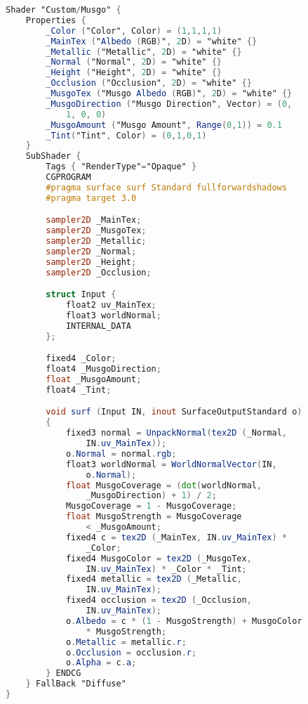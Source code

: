 \label{an:codigo-fonte-musgo-unity}



\begin{lstlisting}[language=GLSL, caption={\label{cf:musgo} Shader de efeito de musgo na Unity}]
Shader "Custom/Musgo" {
	Properties {
		_Color ("Color", Color) = (1,1,1,1)
		_MainTex ("Albedo (RGB)", 2D) = "white" {}
		_Metallic ("Metallic", 2D) = "white" {}
		_Normal ("Normal", 2D) = "white" {}
		_Height ("Height", 2D) = "white" {}
		_Occlusion ("Occlusion", 2D) = "white" {}
		_MusgoTex ("Musgo Albedo (RGB)", 2D) = "white" {}
		_MusgoDirection ("Musgo Direction", Vector) = (0, 
			1, 0, 0)
		_MusgoAmount ("Musgo Amount", Range(0,1)) = 0.1
		_Tint("Tint", Color) = (0,1,0,1)
	}
	SubShader {
		Tags { "RenderType"="Opaque" }
		CGPROGRAM
		#pragma surface surf Standard fullforwardshadows
		#pragma target 3.0

		sampler2D _MainTex;
		sampler2D _MusgoTex;
		sampler2D _Metallic;
		sampler2D _Normal;
		sampler2D _Height;
		sampler2D _Occlusion;

		struct Input {
			float2 uv_MainTex;
			float3 worldNormal;
			INTERNAL_DATA
		};

		fixed4 _Color;
		float4 _MusgoDirection;
		float _MusgoAmount;
		float4 _Tint;

		void surf (Input IN, inout SurfaceOutputStandard o) 
		{
			fixed3 normal = UnpackNormal(tex2D (_Normal, 
				IN.uv_MainTex));
			o.Normal = normal.rgb;
			float3 worldNormal = WorldNormalVector(IN, 
				o.Normal);
			float MusgoCoverage = (dot(worldNormal, 
				_MusgoDirection) + 1) / 2;
			MusgoCoverage = 1 - MusgoCoverage;
			float MusgoStrength = MusgoCoverage 
				< _MusgoAmount;
			fixed4 c = tex2D (_MainTex, IN.uv_MainTex) * 
				_Color;
			fixed4 MusgoColor = tex2D (_MusgoTex, 
				IN.uv_MainTex) * _Color * _Tint;
			fixed4 metallic = tex2D (_Metallic, 
				IN.uv_MainTex);
			fixed4 occlusion = tex2D (_Occlusion, 
				IN.uv_MainTex);
			o.Albedo = c * (1 - MusgoStrength) + MusgoColor 
				* MusgoStrength;
			o.Metallic = metallic.r;
			o.Occlusion = occlusion.r;
			o.Alpha = c.a;
		} ENDCG
	} FallBack "Diffuse"
}	
\end{lstlisting}

\nocite{wronski2021}

